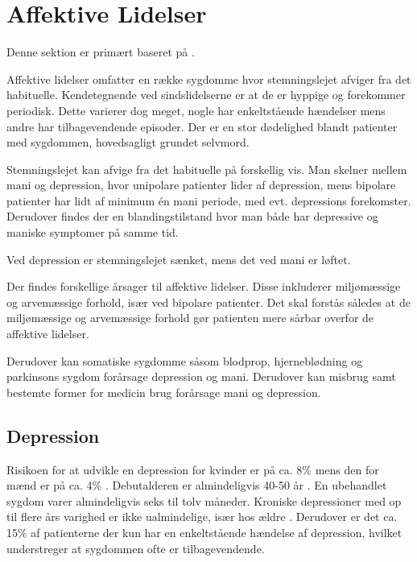 
\section{Affektive Lidelser}\label{sec:affektivelidelser}
Denne sektion er primært baseret på \citet{misc:affektivelidelser, misc:netpsykdepression, misc:netpsykmani}.

Affektive lidelser omfatter en række sygdomme hvor stemningslejet afviger fra det habituelle.
Kendetegnende ved sindslidelserne er at de er hyppige og forekommer periodisk.
Dette varierer dog meget, nogle har enkeltstående hændelser mens andre har tilbagevendende episoder.
Der er en stor dødelighed blandt patienter med sygdommen, hovedsagligt grundet selvmord.

Stemningslejet kan afvige fra det habituelle på forskellig vis.
Man skelner mellem mani og depression, hvor unipolare patienter lider af depression, mens bipolare patienter har lidt af minimum én mani periode, med evt. depressions forekomster. Derudover findes der en blandingstilstand hvor man både har depressive og maniske symptomer på samme tid.

Ved depression er stemningslejet sænket, mens det ved mani er løftet.

Der findes forskellige årsager til affektive lidelser. 
Disse inkluderer miljømæssige og arvemæssige forhold, især ved bipolare patienter.
Det skal forstås således at de miljømæssige og arvemæssige forhold gør patienten mere sårbar overfor de affektive lidelser.

Derudover kan somatiske sygdomme såsom blodprop, hjerneblødning og parkinsons sygdom forårsage depression og mani.
Derudover kan misbrug samt bestemte former for medicin brug forårsage mani og depression.

\subsection{Depression}
Risikoen for at udvikle en depression for kvinder er på ca. 8\% mens den for mænd er på ca. 4\% \citep{misc:affektivelidelser}.
Debutalderen er almindeligvis 40-50 år \citep{misc:affektivelidelser}.
En ubehandlet sygdom varer almindeligvis seks til tolv måneder.
Kroniske depressioner med op til flere års varighed er ikke ualmindelige, især hos ældre \citep{misc:affektivelidelser}.
Derudover er det ca. 15\% af patienterne der kun har en enkeltstående hændelse af depression, hvilket understreger at sygdommen ofte er tilbagevendende.

